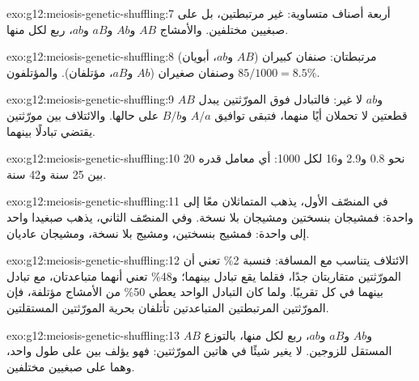 \begin{solution}{exo:g12:meiosis-genetic-shuffling:7}
أربعة أصناف متساوية: غير مرتبطتين، بل على صبغيين مختلفين. والأمشاج
$AB$ و$Ab$ و$aB$ و$ab$، ربع لكل منها.
\end{solution}

\begin{solution}{exo:g12:meiosis-genetic-shuffling:8}
مرتبطتان: صنفان كبيران ($AB$ و$ab$، أبويان) وصنفان صغيران ($Ab$
و$aB$، مؤتلفان). والمؤتلفون $85/1000 = 8.5\%$.
\end{solution}

\begin{solution}{exo:g12:meiosis-genetic-shuffling:9}
$AB$ و$ab$ لا غير: فالتبادل فوق المورّثتين يبدل قطعتين لا تحملان أيًا
منهما، فتبقى توافيق $A/a$ و$B/b$ على حالها. والائتلاف بين مورّثتين
يقتضي تبادلًا بينهما.
\end{solution}

\begin{solution}{exo:g12:meiosis-genetic-shuffling:10}
نحو 0.8 و2.9 و16 لكل 1000: أي معامل قدره 20 بين 25 سنة و42 سنة.
\end{solution}

\begin{solution}{exo:g12:meiosis-genetic-shuffling:11}
في المنصّف الأول، يذهب المتماثلان معًا إلى  واحدة: فمشيجان بنسختين
ومشيجان بلا نسخة. وفي المنصّف الثاني، يذهب صبغيدا  واحد إلى 
واحدة: فمشيج بنسختين، ومشيج بلا نسخة، ومشيجان عاديان.
\end{solution}

\begin{solution}{exo:g12:meiosis-genetic-shuffling:12}
الائتلاف يتناسب مع المسافة: فنسبة 2\% تعني أن المورّثتين متقاربتان جدًا،
فقلما يقع تبادل بينهما؛ و48\% تعني أنهما متباعدتان، مع تبادل بينهما في
كل  تقريبًا. ولما كان التبادل الواحد يعطي 50\% من الأمشاج
مؤتلفة، فإن المورّثتين المرتبطتين المتباعدتين تأتلفان بحرية المورّثتين
المستقلتين.
\end{solution}

\begin{solution}{exo:g12:meiosis-genetic-shuffling:13}
$AB$ و$Ab$ و$aB$ و$ab$، ربع لكل منها، بالتوزع المستقل للزوجين.
 لا يغير شيئًا في هاتين المورّثتين: فهو يؤلف بين  على
طول  واحد، وهما على صبغيين مختلفين.
\end{solution}

